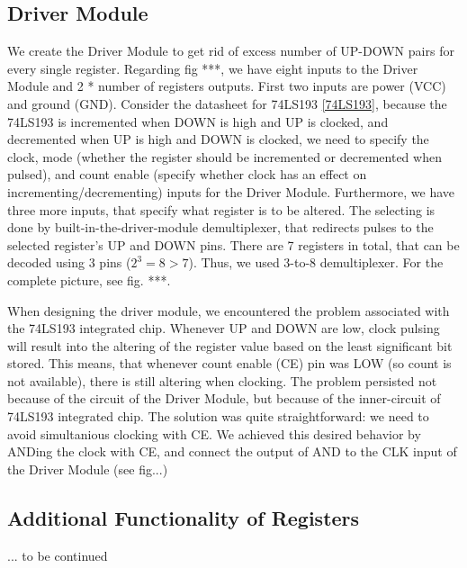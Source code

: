 \subsection{Driver Module}
We create the Driver Module to get rid of excess number of UP-DOWN pairs for every single register. Regarding fig ***, we have eight inputs to the Driver Module and 2 * number of registers outputs. First two inputs are power (VCC) and ground (GND). Consider the datasheet for 74LS193 \ref{74LS193}, because the 74LS193 is incremented when DOWN is high and UP is clocked, and decremented when UP is high and DOWN is clocked, we need to specify the clock, mode (whether the register should be incremented or decremented when pulsed), and count enable (specify whether clock has an effect on incrementing/decrementing) inputs for the Driver Module. Furthermore, we have three more inputs, that specify what register is to be altered. The selecting is done by built-in-the-driver-module demultiplexer, that redirects pulses to the selected register's UP and DOWN pins. There are 7 registers in total, that can be decoded using 3 pins ($2^3 = 8 > 7$). Thus, we used 3-to-8 demultiplexer. For the complete picture, see fig. ***.

When designing the driver module, we encountered the problem associated with the 74LS193 integrated chip. Whenever UP and DOWN are low, clock pulsing will result into the altering of the register value based on the least significant bit stored. This means, that whenever count enable (CE) pin was LOW (so count is not available), there is still altering when clocking. The problem persisted not because of the circuit of the Driver Module, but because of the inner-circuit of 74LS193 integrated chip. The solution was quite straightforward: we need to avoid simultanious clocking with CE. We achieved this desired behavior by ANDing the clock with CE, and connect the output of AND to the CLK input of the Driver Module (see fig...)

\subsection{Additional Functionality of Registers}
... to be continued
 
